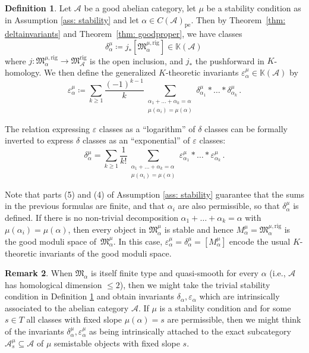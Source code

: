 \documentclass[12pt]{amsart}
\theoremstyle{definition}
\newtheorem{definition}{Definition}[section]
\newtheorem{remark}[definition]{Remark}
\newcommand{\BK}{{\mathbb{K}}}
\newcommand{\CA}{{\mathcal A}}
\newcommand{\1}{\mathbf 1}
\newcommand{\FM}{{\mathfrak{M}}}
\newcommand{\rig}{\mathrm{rig}}
\newcommand{\pe}{\mathrm{pe}}
\begin{document}
\begin{definition}\label{def: K-invariants}
    Let $\CA$ be a good abelian category, let $\mu$ be a stability condition as in Assumption \ref{ass: stability} and let $\alpha\in C(\CA)_\pe$. Then by Theorem~\ref{thm: deltainvariants} and Theorem~\ref{thm: goodproper}, we have classes
    \[\delta_\alpha^\mu\coloneqq j_\ast[\FM_{\alpha}^{\mu, \rig}]\in \BK(\CA)\,\]
    where $j\colon \FM_\alpha^{\mu, \rig}\to \FM_\CA^\rig$ is the open inclusion, and $j_\ast$ the pushforward in $K$-homology.
    We then define the generalized $K$-theoretic invariants $\varepsilon_\alpha^\mu\in \BK(\CA)$ by
      \begin{equation}
      \label{eq: epsilonfromdelta}\varepsilon_\alpha^\mu\coloneqq \sum_{k\geq 1}\frac{(-1)^{k-1}}{k}\sum_{\substack{\alpha_1+\ldots+\alpha_k=\alpha\\\mu(\alpha_i)=\mu(\alpha)}}\delta^\mu_{\alpha_1}\ast\ldots \ast\delta^\mu_{\alpha_{k}}\,.
      \end{equation}
\end{definition}

The relation expressing $\varepsilon$ classes as a ``logarithm'' of $\delta$ classes can be formally inverted to express $\delta$ classes as an ``exponential'' of $\varepsilon$ classes:
\begin{equation}
      \label{eq: deltafromepsilon}
  \delta_\alpha^\mu=\sum_{k\geq 1}\frac{1}{k!}\sum_{\substack{\alpha_1+\ldots+\alpha_k=\alpha\\\mu(\alpha_i)=\mu(\alpha)}}\varepsilon^\mu_{\alpha_1}\ast\ldots \ast\varepsilon^\mu_{\alpha_{k}}\,.\end{equation}


Note that parts (5) and (4) of Assumption \ref{ass: stability} guarantee that the sums in the previous formulas are finite, and that $\alpha_i$ are also permissible, so that $\delta_\alpha^\mu$ is defined. If there is no non-trivial decomposition $\alpha_1+\ldots+\alpha_k=\alpha$ with $\mu(\alpha_i)=\mu(\alpha)$, then every object in $\FM_{\alpha}^\mu$ is stable and hence $M_\alpha^\mu=\FM_\alpha^{\mu, \rig}$ is the good moduli space of~$\FM_{\alpha}^\mu$. In this case, $\varepsilon_\alpha^\mu=\delta_\alpha^\mu=[M_\alpha^\mu]$ encode the usual $K$-theoretic invariants of the good moduli space.

\begin{remark}
    When $\FM_\alpha$ is itself finite type and quasi-smooth for every $\alpha$ (i.e., $\CA$ has homological dimension $\leq 2$), then we might take the trivial stability condition in Definition \ref{def: K-invariants} and obtain invariants $\delta_\alpha, \varepsilon_\alpha$ which are intrinsically associated to the abelian category $\CA$. If $\mu$ is a stability condition and for some $s\in T$ all classes with fixed slope $\mu(\alpha)=s$ are permissible, then we might think of the invariants $\delta_\alpha^\mu, \varepsilon_\alpha^\mu$ as being intrinsically attached to the exact subcategory $\CA^\mu_s\subseteq \CA$ of $\mu$ semistable objects with fixed slope $s$.
\end{remark}
\end{document}
